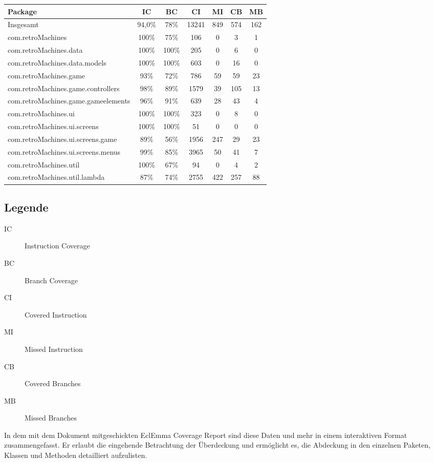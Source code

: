 \documentclass[parskip=full]{scrreprt}
\begin{document}
\begin{tabular} { | l | c | c | c | c | c | c | }
	\hline
	\textbf{Package} & \textbf{IC} & \textbf{BC} & \textbf{CI} & \textbf{MI} & \textbf{CB} & \textbf{MB} \\
	\hline
	Insgesamt & 94,0\% & 78\% & 13241 & 849 & 574 & 162 \\
	\hline
	com.retroMachines & 100\% & 75\% & 106 & 0 & 3 & 1 \\
	\hline
	com.retroMachines.data & 100\% & 100\% & 205 & 0 & 6 & 0  \\
	\hline
	com.retroMachines.data.models & 100\% & 100\% & 603 & 0 & 16 & 0 \\
	\hline
	com.retroMachines.game & 93\% & 72\% & 786 & 59 & 59 & 23 \\
	\hline
	com.retroMachines.game.controllers & 98\% & 89\% & 1579 & 39 & 105 & 13 \\
	\hline
	com.retroMachines.game.gameelements & 96\% & 91\% & 639 & 28 & 43 & 4 \\
	\hline
	com.retroMachines.ui & 100\% & 100\% & 323 & 0 & 8 & 0 \\
	\hline
	com.retroMachines.ui.screens & 100\% & 100\% & 51 & 0 & 0 & 0 \\
	\hline
	com.retroMachines.ui.screens.game & 89\% & 56\% & 1956 & 247 & 29 & 23 \\
	\hline
	com.retroMachines.ui.screens.menus & 99\% & 85\% & 3965 & 50 & 41 & 7 \\
	\hline
	com.retroMachines.util & 100\% & 67\% & 94 & 0 & 4 & 2 \\
	\hline
	com.retroMachines.util.lambda & 87\% & 74\% & 2755 & 422 & 257 & 88\\
	\hline
\end{tabular}

\subsection*{Legende}
\begin{description}
	\item[IC] Instruction Coverage
	\item[BC] Branch Coverage
	\item[CI] Covered Instruction
	\item[MI] Missed Instruction
	\item[CB] Covered Branches
	\item[MB] Missed Branches
\end{description}	

In dem mit dem Dokument mitgeschickten EclEmma Coverage Report sind diese Daten und mehr in einem interaktiven Format zusammengefasst. 
Er erlaubt die eingehende Betrachtung der Überdeckung und ermöglicht es, die Abdeckung in den einzelnen Paketen, Klassen und Methoden detailliert aufzulisten.
\end{document}
